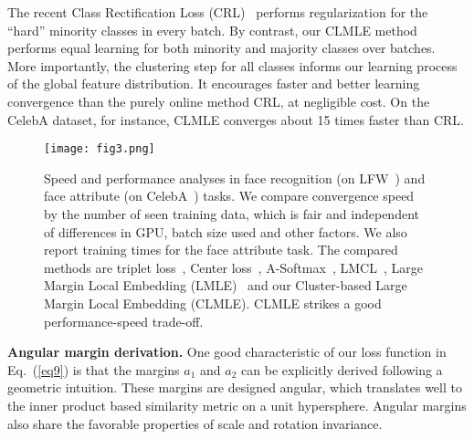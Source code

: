 \documentclass[10pt,journal,compsoc]{IEEEtran}
\begin{document}
The recent Class Rectification Loss (CRL)~\cite{Dong_2017_ICCV} performs regularization for the ``hard'' minority classes in every batch. By contrast, our CLMLE method performs equal learning for both minority and majority classes over batches. More importantly, the clustering step for all classes informs our learning process of the global feature distribution. It encourages faster and better learning convergence than the purely online method CRL, at negligible cost. On the CelebA dataset, for instance, CLMLE converges about 15 times faster than CRL.

\begin{figure}[t]
\begin{center}
\texttt{[image: fig3.png]}
\end{center}
\vspace{-1.5em}
\caption{Speed and performance analyses in face recognition (on LFW~\cite{LFWTech}) and face attribute (on CelebA~\cite{liu15}) tasks. We compare convergence speed by the number of seen training data, which is fair and independent of differences in GPU, batch size used and other factors. We also report training times for the face attribute task. The compared methods are triplet loss~\cite{Schroff15}, Center loss~\cite{wen2016}, A-Softmax~\cite{liu2017sphereface}, LMCL~\cite{2018Wang}, Large Margin Local Embedding (LMLE)~\cite{huang2016lmle} and our Cluster-based Large Margin Local Embedding (CLMLE). CLMLE strikes a good performance-speed trade-off.}
\vspace{-0.8em}
\label{fig3}
\end{figure}

\noindent
{\bf Angular margin derivation.} One good characteristic of our loss function in Eq.~(\ref{eq9}) is that the margins $a_1$ and $a_2$ can be explicitly derived following a geometric intuition. These margins are designed angular, which translates well to the inner product based similarity metric on a unit hypersphere. Angular margins also share the favorable properties of scale and rotation invariance.
\end{document}

